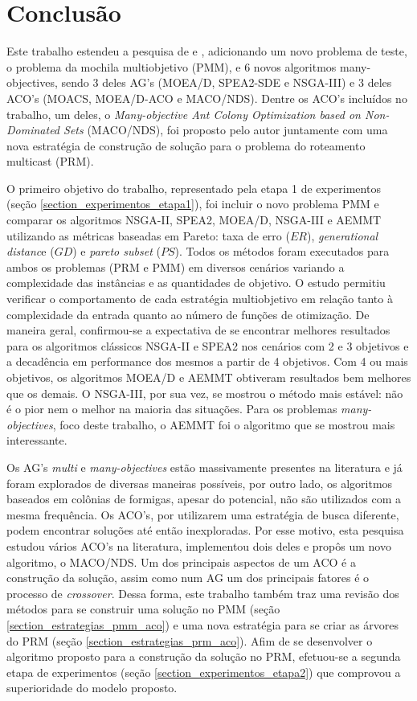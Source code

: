 \chapter[Conclusão]{Conclusão}
Este trabalho estendeu a pesquisa de \cite{Bueno2010} e \cite{Lafeta2016}, adicionando um novo problema de teste, o problema da mochila multiobjetivo (PMM), e 6 novos algoritmos many-objectives, sendo 3 deles AG's (MOEA/D, SPEA2-SDE e NSGA-III) e 3 deles ACO's (MOACS, MOEA/D-ACO e MACO/NDS). Dentre os ACO's incluídos no trabalho, um deles, o \textit{Many-objective Ant Colony Optimization based on Non-Dominated Sets} (MACO/NDS), foi proposto pelo autor juntamente com uma nova estratégia de construção de solução para o problema do roteamento multicast (PRM).

O primeiro objetivo do trabalho, representado pela etapa 1 de experimentos (seção \ref{section_experimentos_etapa1}), foi incluir o novo problema PMM e comparar os algoritmos NSGA-II, SPEA2, MOEA/D, NSGA-III e AEMMT utilizando as métricas baseadas em Pareto: taxa de erro ($ER$), \textit{generational distanc}e ($GD$) e \textit{pareto subset} ($PS$). Todos os métodos foram executados para ambos os problemas (PRM e PMM) em diversos cenários variando a complexidade das instâncias e as quantidades de objetivo. O estudo permitiu verificar o comportamento de cada estratégia multiobjetivo em relação tanto à complexidade da entrada quanto ao número de funções de otimização. De maneira geral, confirmou-se a expectativa de se encontrar melhores resultados para os algoritmos clássicos NSGA-II e SPEA2 nos cenários com 2 e 3 objetivos e a decadência em performance dos mesmos a partir de 4 objetivos. Com 4 ou mais objetivos, os algoritmos MOEA/D e AEMMT obtiveram resultados bem melhores que os demais. O NSGA-III, por sua vez, se mostrou o método mais estável: não é o pior nem o melhor na maioria das situações. Para os problemas \textit{many-objectives}, foco deste trabalho, o AEMMT foi o algoritmo que se mostrou mais interessante.

Os AG's \textit{multi} e \textit{many-objectives} estão massivamente presentes na literatura e já foram explorados de diversas maneiras possíveis, por outro lado, os algoritmos baseados em colônias de formigas, apesar do potencial, não são utilizados com a mesma frequência. Os ACO's, por utilizarem uma estratégia de busca diferente, podem encontrar soluções até então inexploradas. Por esse motivo, esta pesquisa estudou vários ACO's na literatura, implementou dois deles e propôs um novo algoritmo, o MACO/NDS. Um dos principais aspectos de um ACO é a construção da solução, assim como num AG um dos principais fatores é o processo de \textit{crossover}. Dessa forma, este trabalho também traz uma revisão dos métodos para se construir uma solução no PMM (seção \ref{section_estrategias_pmm_aco}) e uma nova estratégia para se criar as árvores do PRM (seção \ref{section_estrategias_prm_aco}). Afim de se desenvolver o algoritmo proposto para a construção da solução no PRM, efetuou-se a segunda etapa de experimentos (seção \ref{section_experimentos_etapa2}) que comprovou a superioridade do modelo proposto.

